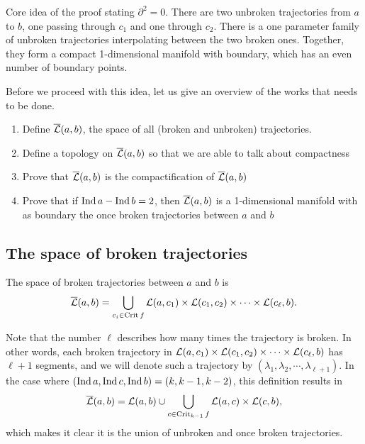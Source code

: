 \begin{marginfigure}
    \centering
    \caption{
        Core idea of the proof stating $\partial^2 = 0$.
        There are two unbroken trajectories from $a$ to $b$, one passing through $c_1$ and one through $c_2$.
        There is a one parameter family of unbroken trajectories interpolating between the two broken ones.
        Together, they form a compact 1-dimensional manifold with boundary, which has an even number of boundary points.
    }
    \label{fig:morse-complex-is-a-complex-idea-of-proof}
\end{marginfigure}

Before we proceed with this idea, let us give an overview of the works that needs to be done.

\begin{enumerate}
    \item Define $\overline{\mathcal L}(a, b)$, the space of all (broken and unbroken) trajectories.
    \item Define a topology on $\overline{\mathcal L}(a, b)$ so that we are able to talk about compactness
    \item Prove that  $\overline{\mathcal L}(a, b)$ is the compactification of $\overline{\mathcal L}(a, b)$
    \item Prove that if $\operatorname{Ind} a - \operatorname{Ind} b = 2$, then $\overline{\mathcal L}(a, b)$ is a 1-dimensional manifold with as boundary the once broken trajectories between $a$ and  $b$
\end{enumerate}

\subsection{The space of broken trajectories}
\begin{definition}
    The space of broken trajectories between $a$ and  $b$ is
     \[
         \overline{\mathcal L}(a, b) = \bigcup_{c_i \in \operatorname{Crit} f} \mathcal L(a, c_1) \times \mathcal L(c_1, c_2) \times  \cdots \times \mathcal L(c_\ell, b)
    .\] 
\end{definition}

    Note that the number $\ell$ describes how many times the trajectory is broken.
    In other words, each broken trajectory in $\mathcal L(a, c_1) \times \mathcal L(c_1, c_2) \times  \cdots \times \mathcal L(c_\ell, b)$ has $ \ell+1$ segments,  and we will denote such a trajectory by $(\lambda_1, \lambda_2, \cdots, \lambda_{\ell+1})$.
    In the case where $(\operatorname{Ind} a, \operatorname{Ind} c, \operatorname{Ind} b) = (k, k-1, k-2)$, this definition results in
    \[
        \overline{\mathcal L}(a, b) = \mathcal L(a, b) \cup  \bigcup_{c \in \operatorname{Crit}_{k-1} f}  \mathcal L(a, c) \times \mathcal L(c, b)
    ,\] 
    which makes it clear it is the union of unbroken and once broken trajectories.
    


